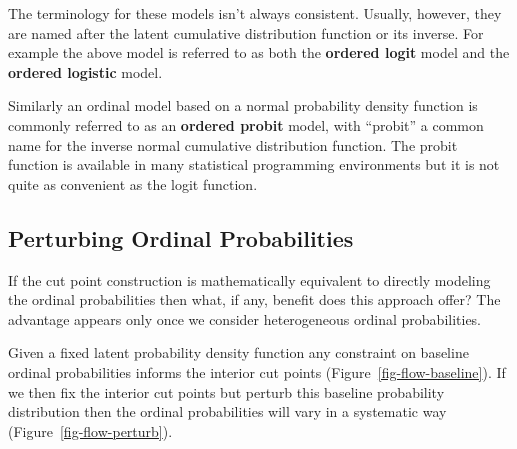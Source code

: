 \documentclass[
  letterpaper,
  DIV=11,
  numbers=noendperiod]{scrartcl}
\begin{document}
The terminology for these models isn't always consistent. Usually,
however, they are named after the latent cumulative distribution
function or its inverse. For example the above model is referred to as
both the \textbf{ordered logit} model and the \textbf{ordered logistic}
model.

Similarly an ordinal model based on a normal probability density
function is commonly referred to as an \textbf{ordered probit} model,
with ``probit'' a common name for the inverse normal cumulative
distribution function. The probit function is available in many
statistical programming environments but it is not quite as convenient
as the logit function.

\subsection{Perturbing Ordinal
Probabilities}\label{perturbing-ordinal-probabilities}

If the cut point construction is mathematically equivalent to directly
modeling the ordinal probabilities then what, if any, benefit does this
approach offer? The advantage appears only once we consider
heterogeneous ordinal probabilities.

Given a fixed latent probability density function any constraint on
baseline ordinal probabilities informs the interior cut points
(Figure~\ref{fig-flow-baseline}). If we then fix the interior cut points
but perturb this baseline probability distribution then the ordinal
probabilities will vary in a systematic way
(Figure~\ref{fig-flow-perturb}).
\end{document}
